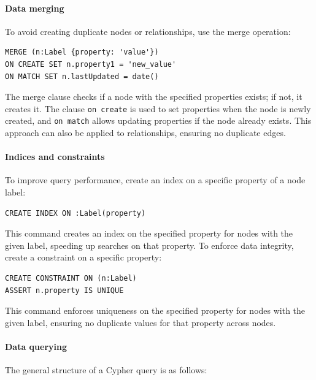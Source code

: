\paragraph*{Data merging}
To avoid creating duplicate nodes or relationships, use the merge operation:
\begin{lstlisting}[style=Cypher]
MERGE (n:Label {property: 'value'})
ON CREATE SET n.property1 = 'new_value'
ON MATCH SET n.lastUpdated = date()
\end{lstlisting}
The merge clause checks if a node with the specified properties exists; if not, it creates it. 
The clause \texttt{on create} is used to set properties when the node is newly created, and \texttt{on match} allows updating properties if the node already exists. 
This approach can also be applied to relationships, ensuring no duplicate edges.

\paragraph*{Indices and constraints}
To improve query performance, create an index on a specific property of a node label:

\begin{lstlisting}[style=Cypher]
CREATE INDEX ON :Label(property)
\end{lstlisting}
This command creates an index on the specified property for nodes with the given label, speeding up searches on that property.
To enforce data integrity, create a constraint on a specific property:

\begin{lstlisting}[style=Cypher]
CREATE CONSTRAINT ON (n:Label)
ASSERT n.property IS UNIQUE
\end{lstlisting}
This command enforces uniqueness on the specified property for nodes with the given label, ensuring no duplicate values for that property across nodes.

\paragraph*{Data querying}
The general structure of a Cypher query is as follows:

